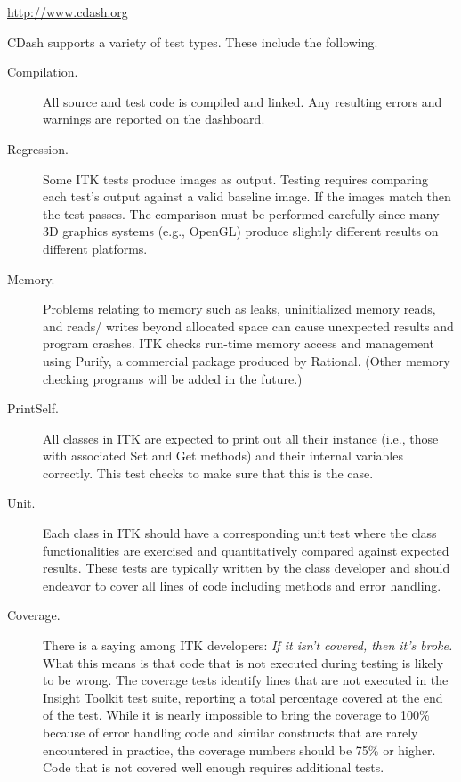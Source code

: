 \begin{center}
\url{http://www.cdash.org}
\end{center}

CDash supports a variety of test types. These include the following.
\begin{description}
        \item[Compilation.] All source and test code is compiled and linked.
        Any resulting errors and warnings are reported on the dashboard.

        \item[Regression.] Some ITK tests produce images as output. Testing
        requires comparing each test's output against a valid baseline image. If
        the images match then the test passes. The comparison must be
        performed carefully since many 3D graphics systems (e.g., OpenGL)
        produce slightly different results on different platforms.

        \item[Memory.] Problems relating to memory such as leaks, uninitialized
        memory reads, and reads/ writes beyond allocated space can cause
        unexpected results and program crashes. ITK checks run-time memory
        access and management using Purify, a commercial package produced by
        Rational. (Other memory checking programs will be added in the future.)

        \item[PrintSelf.] All classes in ITK are expected to print out all
        their instance (i.e., those with associated Set and Get
        methods) and their internal variables correctly. This test checks to
        make sure that this is the case.

        \item[Unit.] Each class in ITK should have a corresponding unit test
        where the class functionalities are exercised and quantitatively
        compared against expected results. These tests are typically written
        by the class developer and should endeavor to cover all lines of code
        including  methods and error handling.

       \item[Coverage.] There is a saying among ITK developers: \emph{If it
        isn't covered, then it's broke.} What this means is that
        code that is not executed during testing is likely to be wrong. The
        coverage tests identify lines that are not executed in the
        Insight Toolkit test suite, reporting a total percentage
        covered at the end of the test. While it is nearly impossible to
        bring the coverage to 100\% because of error handling code and similar
        constructs that are rarely encountered in practice, the coverage
        numbers should be 75\% or higher. Code that is not covered well enough
        requires additional tests.
\end{description}

